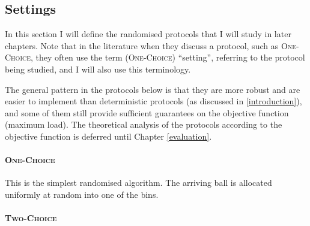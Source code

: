 







\subsection{Settings} \label{settings}

In this section I will define the randomised protocols that I will study in later chapters. Note that in the literature when they discuss a protocol, such as \textsc{One-Choice}, they often use the term (\textsc{One-Choice}) ``setting'', referring to the protocol being studied, and I will also use this terminology.


The general pattern in the protocols below is that they are more robust and are easier to implement than deterministic protocols (as discussed in \cref{introduction}), and some of them still provide sufficient guarantees on the objective function (maximum load). The theoretical analysis of the protocols according to the objective function is deferred until Chapter \ref{evaluation}.


\paragraph{\textsc{One-Choice}}

This is the simplest randomised algorithm. The arriving ball is allocated uniformly at random into one of the bins.

\paragraph{\textsc{Two-Choice}}

